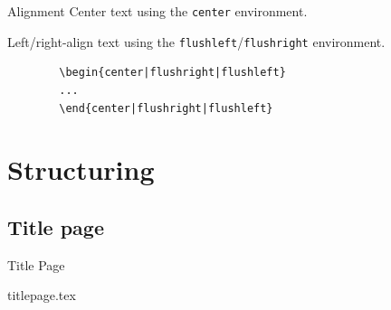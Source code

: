 \documentclass[table]{beamer}
\begin{document}
\begin{frame}[fragile]{Alignment}
    Center text using the \texttt{center} environment.
    \vspace{0.5em}

    Left/right-align text using the \texttt{flushleft}/\texttt{flushright}
    environment.

    \begin{center}
    \begin{verbatim}
        \begin{center|flushright|flushleft}
        ...
        \end{center|flushright|flushleft}
    \end{verbatim}
    \end{center}


\end{frame}


\section{Structuring}

\subsection{Title page}
\begin{frame}[fragile]{Title Page}
    \begin{block}{titlepage.tex}
    \inputminted{latex}{resource/first-titlepage.tex}
    \end{block}
\end{frame}
\end{document}
